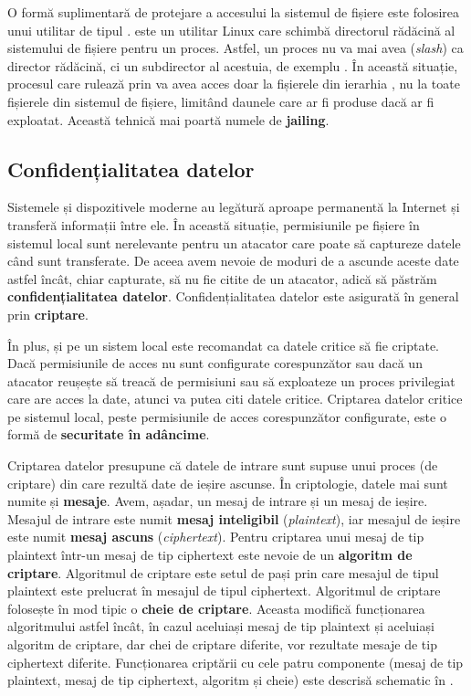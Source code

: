 O formă suplimentară de protejare a accesului la sistemul de fișiere este folosirea unui utilitar de tipul .  este un utilitar Linux care schimbă directorul rădăcină al sistemului de fișiere pentru un proces. Astfel, un proces nu va mai avea \file{/} (\textit{slash}) ca director rădăcină, ci un subdirector al acestuia, de exemplu . În această situație, procesul care rulează prin  va avea acces doar la fișierele din ierarhia , nu la toate fișierele din sistemul de fișiere, limitând daunele care ar fi produse dacă ar fi exploatat. Această tehnică mai poartă numele de \textbf{jailing}.

\subsection{Confidențialitatea datelor}
\label{sec:sec:data:confidentiality}

Sistemele și dispozitivele moderne au legătură aproape permanentă la Internet și transferă informații între ele. În această situație, permisiunile pe fișiere în sistemul local sunt nerelevante pentru un atacator care poate să captureze datele când sunt transferate. De aceea avem nevoie de moduri de a ascunde aceste date astfel încât, chiar capturate, să nu fie citite de un atacator, adică să păstrăm \textbf{confidențialitatea datelor}. Confidențialitatea datelor este asigurată în general prin \textbf{criptare}.

În plus, și pe un sistem local este recomandat ca datele critice să fie criptate. Dacă permisiunile de acces nu sunt configurate corespunzător sau dacă un atacator reușește să treacă de permisiuni sau să exploateze un proces privilegiat care are acces la date, atunci va putea citi datele critice. Criptarea datelor critice pe sistemul local, peste permisiunile de acces corespunzător configurate, este o formă de \textbf{securitate în adâncime}.

Criptarea datelor presupune că datele de intrare sunt supuse unui proces (de criptare) din care rezultă date de ieșire ascunse. În criptologie, datele mai sunt numite și \textbf{mesaje}. Avem, așadar, un mesaj de intrare și un mesaj de ieșire. Mesajul de intrare este numit \textbf{mesaj inteligibil} (\textit{plaintext}), iar mesajul de ieșire este numit \textbf{mesaj ascuns} (\textit{ciphertext}). Pentru criptarea unui mesaj de tip plaintext într-un mesaj de tip ciphertext este nevoie de un \textbf{algoritm de criptare}. Algoritmul de criptare este setul de pași prin care mesajul de tipul plaintext este prelucrat în mesajul de tipul ciphertext. Algoritmul de criptare folosește în mod tipic o \textbf{cheie de criptare}. Aceasta modifică funcționarea algoritmului astfel încât, în cazul aceluiași mesaj de tip plaintext și aceluiași algoritm de criptare, dar chei de criptare diferite, vor rezultate mesaje de tip ciphertext diferite. Funcționarea criptării cu cele patru componente (mesaj de tip plaintext, mesaj de tip ciphertext, algoritm și cheie) este descrisă schematic în .

